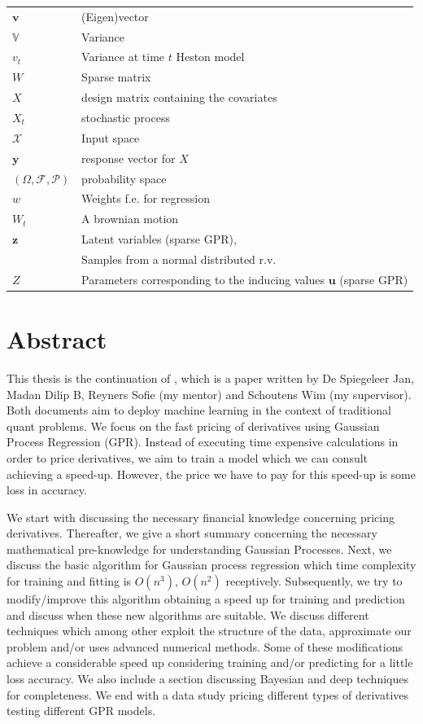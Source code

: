\documentclass[12pt,a4paper,oneside]{book}
\begin{document}
\begin{tabular}{ll}
$\bm{v}$ & (Eigen)vector \\ 
$\mathbb{V}$ &  Variance  \\
$v_t$ & Variance at time $t$ Heston model \\
$W$ & Sparse matrix    \\
$X$ &  design matrix containing the covariates \\
$X_t$ & stochastic process \\
$\mathcal{X}$ & Input space   \\
$\bm{y}$&   response vector for $X$\\
$(\Omega, \mathcal{F}, \mathcal{P})$ &  probability space  \\
$w$ & Weights f.e. for regression \\
$W_t$ &  A brownian motion  \\
$\bm{z}$ & Latent variables (sparse GPR), \\
& Samples from a normal distributed r.v.  \\
$Z$ & Parameters corresponding to the inducing values $\bm{u}$ (sparse GPR) \\
\end{tabular}

\mainmatter


\chapter{Abstract} 

This thesis is the continuation of \cite{de2018machine}, which is a paper written by De Spiegeleer Jan, Madan Dilip B, Reyners Sofie (my mentor) and Schoutens Wim (my supervisor). Both documents aim to deploy machine learning in the context of traditional quant problems. We focus on the fast pricing of derivatives using Gaussian Process Regression (GPR). Instead of executing time expensive calculations in order to price derivatives, we aim to train a model which we can consult achieving a speed-up. However, the price we have to pay for this speed-up is some loss in accuracy. 

We start with discussing the necessary financial knowledge concerning pricing derivatives. Thereafter, we give a short summary concerning the necessary mathematical pre-knowledge for understanding Gaussian Processes. Next, we discuss the basic algorithm for Gaussian process regression which time complexity for training and fitting is $O(n^3)$, $O(n^2)$ receptively. Subsequently, we try to modify/improve this algorithm obtaining a speed up for training and prediction and discuss when these new algorithms are suitable. We discuss different techniques which among other exploit the structure of the data, approximate our problem and/or uses advanced numerical methods. Some of these modifications achieve a considerable speed up considering training and/or predicting for a little loss accuracy. We also include a section discussing Bayesian and deep techniques for completeness. We end with a data study pricing different types of derivatives testing different GPR models.
\end{document}
